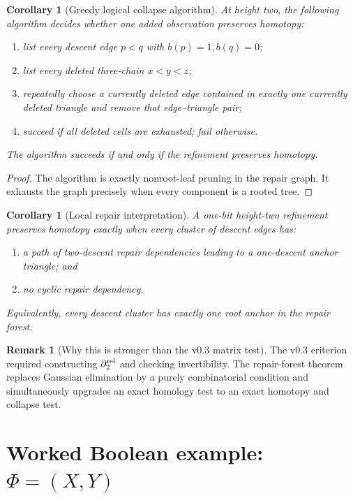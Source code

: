 \documentclass[11pt]{article}
\newtheorem{corollary}[theorem]{Corollary}
\theoremstyle{definition}
\newtheorem{remark}[theorem]{Remark}
\begin{document}
\begin{corollary}[Greedy logical collapse algorithm]\label{cor:greedy}
At height two, the following algorithm decides whether one added observation preserves homotopy:
\begin{enumerate}[label=\arabic*.]
\item list every descent edge $p<q$ with $b(p)=1,b(q)=0$;
\item list every deleted three-chain $x<y<z$;
\item repeatedly choose a currently deleted edge contained in exactly one currently deleted triangle and remove that edge--triangle pair;
\item succeed if all deleted cells are exhausted; fail otherwise.
\end{enumerate}
The algorithm succeeds if and only if the refinement preserves homotopy.
\end{corollary}

\begin{proof}
The algorithm is exactly nonroot-leaf pruning in the repair graph. It exhausts the graph precisely when every component is a rooted tree.
\end{proof}

\begin{corollary}[Local repair interpretation]
A one-bit height-two refinement preserves homotopy exactly when every cluster of descent edges has:
\begin{enumerate}[label=(\roman*)]
\item a path of two-descent repair dependencies leading to a one-descent anchor triangle; and
\item no cyclic repair dependency.
\end{enumerate}
Equivalently, every descent cluster has exactly one root anchor in the repair forest.
\end{corollary}

\begin{remark}[Why this is stronger than the v0.3 matrix test]
The v0.3 criterion required constructing $\partial_2^{\rm rel}$ and checking invertibility. The repair-forest theorem replaces Gaussian elimination by a purely combinatorial condition and simultaneously upgrades an exact homology test to an exact homotopy and collapse test.
\end{remark}

\section{Worked Boolean example: $\Phi=(X,Y)$}
\end{document}
